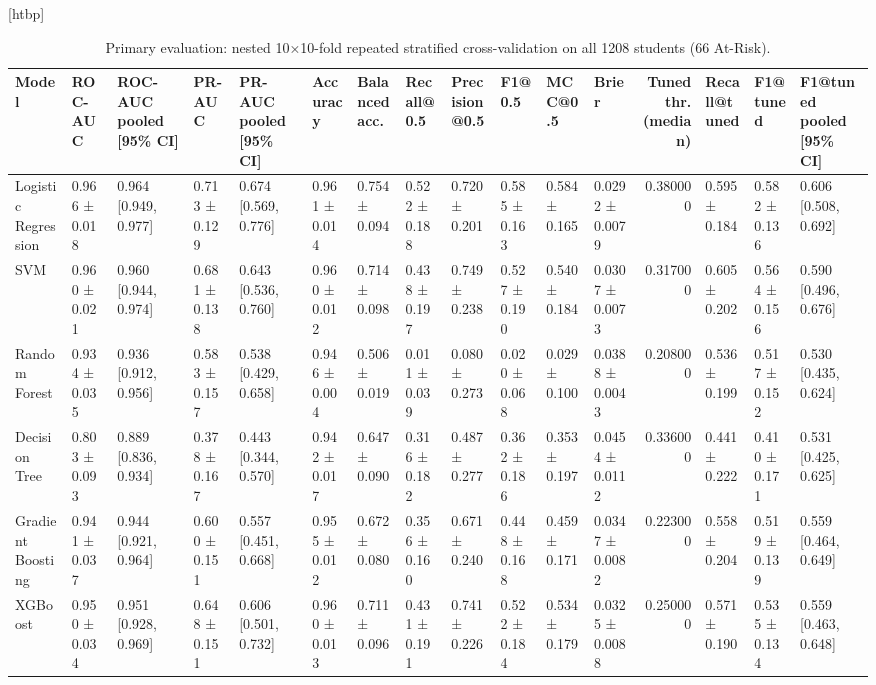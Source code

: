 \begin{table}
\small[htbp]
\caption{Primary evaluation: nested 10×10-fold repeated stratified cross-validation on all 1208 students (66 At-Risk).}
\label{tab:P01_nested_cv_performance}
\begin{tabular}{llllllllllllrlll}
\toprule
Model & ROC-AUC & ROC-AUC pooled [95\% CI] & PR-AUC & PR-AUC pooled [95\% CI] & Accuracy & Balanced acc. & Recall@0.5 & Precision@0.5 & F1@0.5 & MCC@0.5 & Brier & Tuned thr. (median) & Recall@tuned & F1@tuned & F1@tuned pooled [95\% CI] \\
\midrule
Logistic Regression & 0.966 ± 0.018 & 0.964 [0.949, 0.977] & 0.713 ± 0.129 & 0.674 [0.569, 0.776] & 0.961 ± 0.014 & 0.754 ± 0.094 & 0.522 ± 0.188 & 0.720 ± 0.201 & 0.585 ± 0.163 & 0.584 ± 0.165 & 0.0292 ± 0.0079 & 0.380000 & 0.595 ± 0.184 & 0.582 ± 0.136 & 0.606 [0.508, 0.692] \\
SVM & 0.960 ± 0.021 & 0.960 [0.944, 0.974] & 0.681 ± 0.138 & 0.643 [0.536, 0.760] & 0.960 ± 0.012 & 0.714 ± 0.098 & 0.438 ± 0.197 & 0.749 ± 0.238 & 0.527 ± 0.190 & 0.540 ± 0.184 & 0.0307 ± 0.0073 & 0.317000 & 0.605 ± 0.202 & 0.564 ± 0.156 & 0.590 [0.496, 0.676] \\
Random Forest & 0.934 ± 0.035 & 0.936 [0.912, 0.956] & 0.583 ± 0.157 & 0.538 [0.429, 0.658] & 0.946 ± 0.004 & 0.506 ± 0.019 & 0.011 ± 0.039 & 0.080 ± 0.273 & 0.020 ± 0.068 & 0.029 ± 0.100 & 0.0388 ± 0.0043 & 0.208000 & 0.536 ± 0.199 & 0.517 ± 0.152 & 0.530 [0.435, 0.624] \\
Decision Tree & 0.803 ± 0.093 & 0.889 [0.836, 0.934] & 0.378 ± 0.167 & 0.443 [0.344, 0.570] & 0.942 ± 0.017 & 0.647 ± 0.090 & 0.316 ± 0.182 & 0.487 ± 0.277 & 0.362 ± 0.186 & 0.353 ± 0.197 & 0.0454 ± 0.0112 & 0.336000 & 0.441 ± 0.222 & 0.410 ± 0.171 & 0.531 [0.425, 0.625] \\
Gradient Boosting & 0.941 ± 0.037 & 0.944 [0.921, 0.964] & 0.600 ± 0.151 & 0.557 [0.451, 0.668] & 0.955 ± 0.012 & 0.672 ± 0.080 & 0.356 ± 0.160 & 0.671 ± 0.240 & 0.448 ± 0.168 & 0.459 ± 0.171 & 0.0347 ± 0.0082 & 0.223000 & 0.558 ± 0.204 & 0.519 ± 0.139 & 0.559 [0.464, 0.649] \\
XGBoost & 0.950 ± 0.034 & 0.951 [0.928, 0.969] & 0.648 ± 0.151 & 0.606 [0.501, 0.732] & 0.960 ± 0.013 & 0.711 ± 0.096 & 0.431 ± 0.191 & 0.741 ± 0.226 & 0.522 ± 0.184 & 0.534 ± 0.179 & 0.0325 ± 0.0088 & 0.250000 & 0.571 ± 0.190 & 0.535 ± 0.134 & 0.559 [0.463, 0.648] \\
\bottomrule
\end{tabular}
\end{table}

